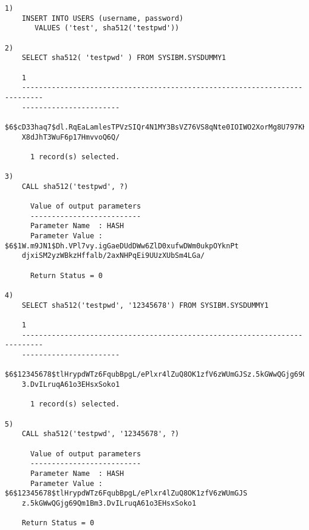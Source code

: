 \begin{verbatim}
1)
    INSERT INTO USERS (username, password)
       VALUES ('test', sha512('testpwd'))

2)
    SELECT sha512( 'testpwd' ) FROM SYSIBM.SYSDUMMY1

    1
    ---------------------------------------------------------------------------
    -----------------------
    $6$cD33haq7$dl.RqEaLamlesTPVzSIQr4N1MY3BsVZ76VS8qNte0IOIWO2XorMg8U797KKOFGm
    X8dJhT3WuF6p17HmvvoQ6Q/

      1 record(s) selected.

3)
    CALL sha512('testpwd', ?)

      Value of output parameters
      --------------------------
      Parameter Name  : HASH
      Parameter Value : $6$1W.m9JN1$Dh.VPl7vy.igGaeDUdDWw6ZlD0xufwDWm0ukpOYknPt
    djxiSM2yzWBkzHffalb/2axNHPqEi9UUzXUbSm4LGa/

      Return Status = 0

4)
    SELECT sha512('testpwd', '12345678') FROM SYSIBM.SYSDUMMY1

    1
    ---------------------------------------------------------------------------
    -----------------------
    $6$12345678$tlHrypdWTz6FqubBpgL/ePlxr4lZuQ8OK1zfV6zWUmGJSz.5kGWwQGjg69Qm1Bm
    3.DvILruqA61o3EHsxSoko1

      1 record(s) selected.

5)
    CALL sha512('testpwd', '12345678', ?)

      Value of output parameters
      --------------------------
      Parameter Name  : HASH
      Parameter Value : $6$12345678$tlHrypdWTz6FqubBpgL/ePlxr4lZuQ8OK1zfV6zWUmGJS
    z.5kGWwQGjg69Qm1Bm3.DvILruqA61o3EHsxSoko1

    Return Status = 0
\end{verbatim}
\newpage
\hypertarget{hphpmd5}{}
